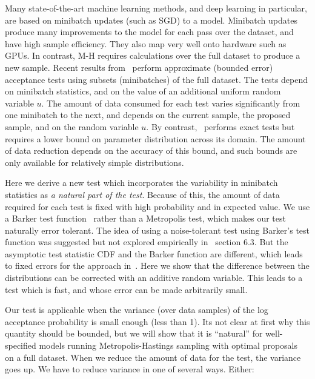 \documentclass{article}
\begin{document}
Many state-of-the-art machine learning methods, and deep learning in particular,
are based on minibatch updates (such as SGD) to a model.  Minibatch updates
produce many improvements to the model for each pass over the dataset, and have
high sample efficiency. They also map very well onto hardware such as GPUs. In
contrast, M-H requires calculations over the full dataset to produce a new
sample.  Recent results from~\cite{cutting_mh_2014,icml2014c1_bardenet14}
perform approximate (bounded error) acceptance tests using subsets (minibatches)
of the full dataset. The tests depend on minibatch statistics, and on the value
of an additional uniform random variable $u$. The amount of data consumed for
each test varies significantly from one minibatch to the next, and depends on
the current sample, the proposed sample, and on the random variable $u$. By
contrast,~\cite{conf/uai/MaclaurinA14} performs exact tests but requires a lower
bound on parameter distribution across its domain.  The amount of data reduction
depends on the accuracy of this bound, and such bounds are only available for
relatively simple distributions.

Here we derive a new test which incorporates the variability in minibatch
statistics as {\em a natural part of the test}. Because of this, the amount of
data required for each test is fixed with high probability and in expected
value.
We use a Barker test function~\cite{Barker65} rather than a Metropolis
test, which makes our test naturally error tolerant. The idea of using
a noise-tolerant test using Barker's test function was suggested but
not explored empirically in~\cite{Bardenet15} section 6.3. But the
asymptotic test statistic CDF and the Barker function are different,
which leads to fixed errors for the approach
in~\cite{Bardenet15}. Here we show that the difference between the
distributions can be corrected with an additive random variable. This
leads to a test which is fast, and whose error can be made arbitrarily
small.

Our test is applicable when the variance (over data samples) of the log
acceptance probability is small enough (less than 1). Its not clear at first why
this quantity should be bounded, but we will show that it is ``natural'' for
well-specified models running Metropolis-Hastings sampling with optimal
proposals~\cite{OptimalScaling01} on a full dataset. When we reduce the amount
of data for the test, the variance goes up. We have to reduce variance in one
of several ways. Either:
\end{document}
